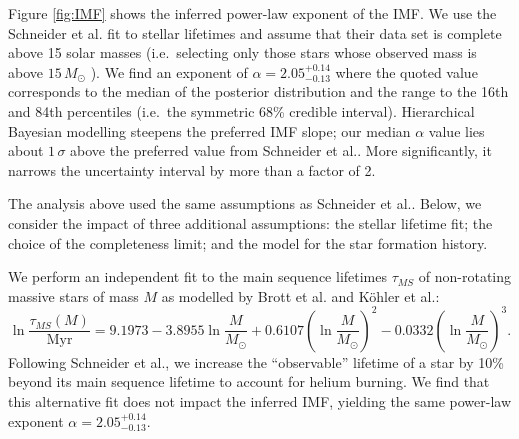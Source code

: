 \documentclass[12pt]{article}
\newcommand{\onesigrange}[3]{\ensuremath{#1^{+#2}_{-#3}}}
\newcommand{\alpharangeone}{\onesigrange{2.05}{0.14}{0.13}}
\newcommand{\alpharangetwo}{\onesigrange{2.05}{0.14}{0.13}}
\begin{document}
Figure \ref{fig:IMF} shows the inferred power-law exponent of the IMF.   We use the Schneider et al.\cite{Schneider:2018} fit to stellar lifetimes and assume
that their data set is complete above 15 solar masses (i.e.\ selecting only
those stars whose observed mass is above $15 \, M_\odot$
\cite{Loredo:2004,BBH:O1}).  We find
an exponent of $\alpha=\alpharangeone$ where the quoted value corresponds to the median
of the posterior distribution and the range to the 16th and 84th percentiles
(i.e.\ the symmetric 68\% credible interval).  %
Hierarchical Bayesian modelling steepens the preferred IMF
slope; our median $\alpha$ value lies about $1\, \sigma$ above the preferred value from
Schneider et al.\cite{Schneider:2018}.  More significantly, it narrows the uncertainty interval by more than a factor of 2.

The analysis above used the same assumptions as Schneider et al.\cite{Schneider:2018}.  Below, we consider the impact of three additional  assumptions: the stellar lifetime fit; the choice of the completeness limit; and the model for the star formation history.

We perform an independent fit to the main sequence lifetimes
$\tau_{MS}$ of non-rotating massive stars of mass $M$ as modelled by Brott et al.\cite{Brott:2011} and K\"{o}hler et al.\cite{Kohler:2015}:
%
\begin{equation}
\ln \frac{\tau_{MS} (M)}{\textrm{Myr}} = 9.1973 - 3.8955 \ln\frac{M}{M_\odot} %
+ 0.6107 \left(\ln\frac{M}{M_\odot} \right)^2 - 0.0332 \left(\ln\frac{M}{M_\odot}\right)^3.
\end{equation}
Following Schneider et al.\cite{Schneider:2018}, we increase the ``observable''
lifetime of a star by 10\% beyond its main sequence lifetime to account for
helium burning.  We find that this alternative fit does not impact the inferred IMF, yielding the same power-law exponent $\alpha=\alpharangetwo$.
\end{document}
